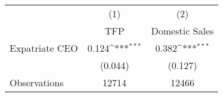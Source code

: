 {
\def\sym#1{\ifmmode^{#1}\else\(^{#1}\)\fi}
\begin{tabular}{l*{2}{c}}
\hline\hline
                    &\multicolumn{1}{c}{(1)}&\multicolumn{1}{c}{(2)}\\
                    &\multicolumn{1}{c}{TFP}&\multicolumn{1}{c}{Domestic Sales}\\
\hline
Expatriate CEO      &       0.124\sym{***}&       0.382\sym{***}\\
                    &     (0.044)         &     (0.127)         \\
\hline
Observations        &       12714         &       12466         \\
\hline\hline
\end{tabular}
}
